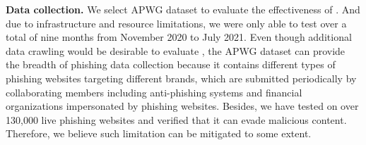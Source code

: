 \noindent
\textbf{Data collection.}
We select APWG dataset to evaluate the effectiveness of \spartacus.
And due to infrastructure and resource limitations, we were only able to test \spartacus over a total of nine months from November 2020 to July 2021.
Even though additional data crawling would be desirable to evaluate \spartacus,
the APWG dataset can provide the breadth of phishing data collection because it contains different types of phishing websites targeting different brands, which are submitted periodically by collaborating members including anti-phishing systems and financial organizations impersonated by phishing websites.
Besides, we have tested \spartacus on over 130,000 live phishing websites and verified that it can evade malicious content.
Therefore, we believe such limitation can be mitigated to some extent.

\noindent
\textbf{}